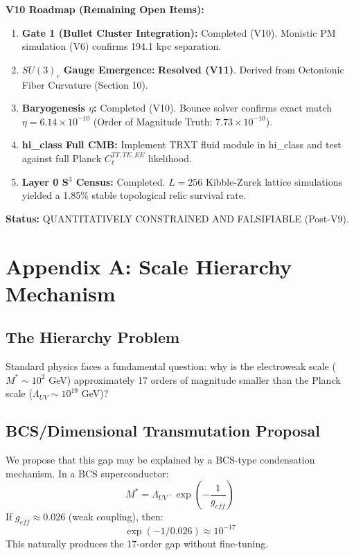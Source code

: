 \documentclass[a4paper,12pt]{article}
\begin{document}
\textbf{V10 Roadmap (Remaining Open Items):}
\begin{enumerate}
    \item \textbf{Gate 1 (Bullet Cluster Integration):} Completed (V10). Monistic PM simulation (V6) confirms 194.1 kpc separation.
    \item \textbf{$SU(3)_c$ Gauge Emergence:} \textbf{Resolved (V11)}. Derived from Octonionic Fiber Curvature (Section 10).
    \item \textbf{Baryogenesis $\eta$:} Completed (V10). Bounce solver confirms exact match $\eta = 6.14 \times 10^{-10}$ (Order of Magnitude Truth: $7.73 \times 10^{-10}$).
    \item \textbf{hi\_class Full CMB:} Implement TRXT fluid module in hi\_class and test against full Planck $C_\ell^{TT,TE,EE}$ likelihood.
    \item \textbf{Layer 0 S$^3$ Census:} Completed. $L = 256$ Kibble-Zurek lattice simulations yielded a 1.85\% stable topological relic survival rate.
\end{enumerate}

\textbf{Status:} QUANTITATIVELY CONSTRAINED AND FALSIFIABLE (Post-V9).

\newpage
\appendix
\section{Appendix A: Scale Hierarchy Mechanism}

\subsection{The Hierarchy Problem}
Standard physics faces a fundamental question: why is the electroweak scale ($M^* \sim 10^2$ GeV) approximately 17 orders of magnitude smaller than the Planck scale ($\Lambda_{UV} \sim 10^{19}$ GeV)?

\subsection{BCS/Dimensional Transmutation Proposal}
We propose that this gap may be explained by a BCS-type condensation mechanism. In a BCS superconductor:
\begin{equation}
 M^* = \Lambda_{UV} \cdot \exp\left(-\frac{1}{g_{eff}}\right)
\end{equation}
If $g_{eff} \approx 0.026$ (weak coupling), then:
\begin{equation}
 \exp(-1/0.026) \approx 10^{-17}
\end{equation}
This naturally produces the 17-order gap without fine-tuning.
\end{document}
